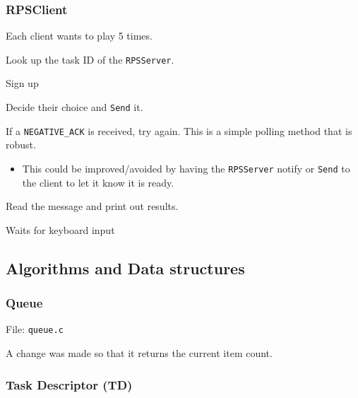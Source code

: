\documentclass[letterpaper, 11pt]{article}
\begin{document}
\subsubsection{RPSClient%
  \label{rpsclient}%
}

Each client wants to play 5 times.
\setcounter{listcnt0}{0}
\begin{list}{.}
{
\setlength{\rightmargin}{\leftmargin}
}

\item Look up the task ID of the \texttt{RPSServer}.

\item Sign up

\item Decide their choice and \texttt{Send} it.

\item If a \texttt{NEGATIVE\_ACK} is received, try again. This is a simple polling method that is robust.
%
\begin{itemize}

\item This could be improved/avoided by having the \texttt{RPSServer} notify or \texttt{Send} to the client to let it know it is ready.

\end{itemize}

\item Read the message and print out results.

\item Waits for keyboard input
\end{list}


\subsection{Algorithms and Data structures%
  \label{algorithms-and-data-structures}%
}


\subsubsection{Queue%
  \label{queue}%
}

File: \texttt{queue.c}

A change was made so that it returns the current item count.


\subsubsection{Task Descriptor (TD)%
  \label{task-descriptor-td}%
}
\end{document}
